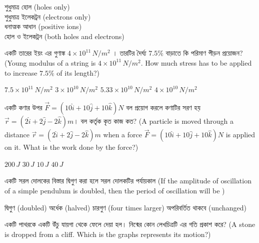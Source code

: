 \documentclass[addpoints]{exam}
\begin{document}
\begin{questions}
\begin{oneparchoices}
\choice  শুধুমাত্র হোল (holes only)\\
\hspace*{-.3cm}\choice   শুধুমাত্র ইলেকট্রন (electrons only)\\
\hspace*{-.3cm}\choice  ধনাত্মক আধান (positive ions)\\
\hspace*{-.3cm}\choice  হোল ও ইলেকট্রন (both holes and electrons)
\end{oneparchoices}

\question  একটি তারের ইয়ং এর গুণাঙ্ক $ 4\times 10^{11}\,N/m^{2} $ । তারটির দৈর্ঘ্য $ 7.5\% $  বাড়াতে কি পরিমাণ পীড়ন প্রয়োজন? (Young modulus of a string is $ 4\times 10^{11}\,N/m^{2} $. How much stress has to be applied to increase $ 7.5\% $ of its length?)

\begin{oneparchoices}
\choice $ 7.5\times 10^{11}\,N/m^{2} $
\choice $ 3\times 10^{10}\,N/m^{2} $
\choice $ 5.33\times 10^{10}\,N/m^{2} $
\choice $ 4\times 10^{10}\,N/m^{2} $

\end{oneparchoices}

\question একটি কণার উপর $ \vec{F}=(10\hat{i}+10\hat{j}+10\hat{k})N $ বল প্রয়োগ করলে কণাটির সরণ হয় $ \vec{r}= (2\hat{i}+2\hat{j}-2\hat{k})m$। বল কর্তৃক কৃত কাজ কত? (A particle is moved through a distance $ \vec{r}= (2\hat{i}+2\hat{j}-2\hat{k})m$ when a force $ \vec{F}=(10\hat{i}+10\hat{j}+10\hat{k})N $ is applied on it. What is the work done by the force?)

\begin{oneparchoices}
\choice $ 200\,J $
\choice $ 30\,J $
\choice $ 10\,J $
\choice $ 40\,J $
\end{oneparchoices}

\question  একটি সরল দোলকের বিস্তার দ্বিগুণ করা হলে সরল দোলকটির পর্যায়কাল (If the amplitude of oscillation of  a simple pendulum is doubled, then the period of oscillation will be )

\begin{oneparchoices}
\choice দ্বিগুণ (doubled)
\hspace*{-.4cm}\choice অর্ধেক (halved)
\hspace*{-.4cm}\choice চারগুণ (four times larger)
\hspace*{-.4cm}\choice অপরিবর্তিত থাকবে (unchanged)
\end{oneparchoices}


\question  একটি পাথরকে একটি উঁচু যায়গা থেকে ফেলে দেয়া হল। নিন্মের কোন লেখচিত্রটি এর গতি প্রকাশ করে? (A stone is dropped from a cliff. Which is the graphs represents its motion?)


\end{questions}
\end{document}
